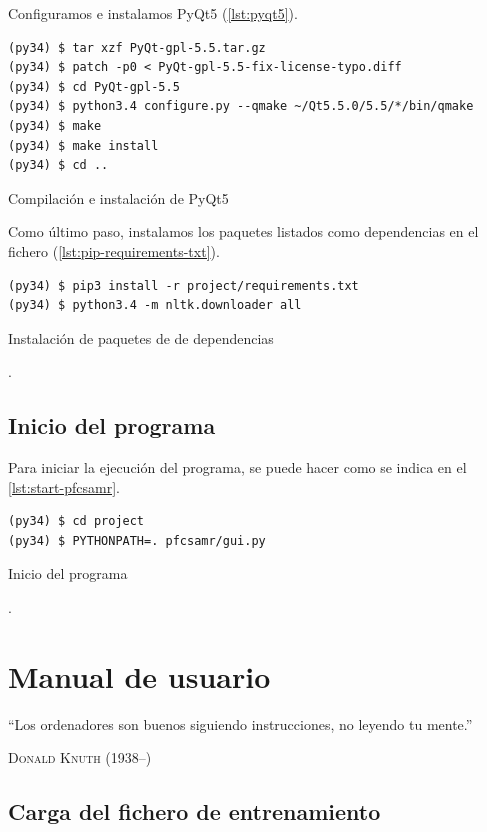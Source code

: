 \newpage
Configuramos e instalamos PyQt5 (\autoref{lst:pyqt5}).

\begin{listing}[htbp]
\begin{verbatim}
(py34) $ tar xzf PyQt-gpl-5.5.tar.gz
(py34) $ patch -p0 < PyQt-gpl-5.5-fix-license-typo.diff
(py34) $ cd PyQt-gpl-5.5
(py34) $ python3.4 configure.py --qmake ~/Qt5.5.0/5.5/*/bin/qmake
(py34) $ make
(py34) $ make install
(py34) $ cd ..
\end{verbatim}
\caption{Compilación e instalación de PyQt5}
\label{lst:pyqt5}
\end{listing}
\FloatBarrier

Como último paso, instalamos los paquetes listados como dependencias en el fichero  (\autoref{lst:pip-requirements-txt}).

\begin{listing}[htbp]
\begin{verbatim}
(py34) $ pip3 install -r project/requirements.txt
(py34) $ python3.4 -m nltk.downloader all
\end{verbatim}
\caption{Instalación de paquetes de  de dependencias}.
\label{lst:pip-requirements-txt}
\end{listing}
\FloatBarrier

\section{Inicio del programa}

Para iniciar la ejecución del programa, se puede hacer como se indica en el \autoref{lst:start-pfcsamr}.

\begin{listing}[htbp]
\begin{verbatim}
(py34) $ cd project
(py34) $ PYTHONPATH=. pfcsamr/gui.py
\end{verbatim}
\caption{Inicio del programa}.
\label{lst:start-pfcsamr}
\end{listing}
\FloatBarrier


\chapter{Manual de usuario}

\epigraph{``Los ordenadores son buenos siguiendo instrucciones, no leyendo tu mente.''}{\textsc{Donald Knuth} (1938--)}

\section{Carga del fichero de entrenamiento}

